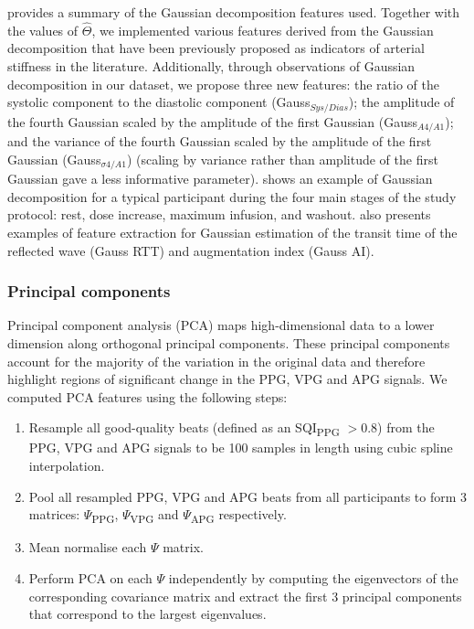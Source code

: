 \documentclass[fleqn,10pt]{wlscirep}
\begin{document}
 provides a summary of the Gaussian decomposition features used. Together with the values of $\hat{\Theta}$, we implemented various features derived from the Gaussian decomposition that have been previously proposed as indicators of arterial stiffness in the literature\cite{Rubins2008,Couceiro2012}. Additionally, through observations of Gaussian decomposition in our dataset, we propose three new features: the ratio of the systolic component to the diastolic component (Gauss$_{Sys/Dias}$); the amplitude of the fourth Gaussian scaled by the amplitude of the first Gaussian (Gauss$_{A4/A1}$); and the variance of the fourth Gaussian scaled by the amplitude of the first Gaussian (Gauss$_{\sigma4/A1}$) (scaling by variance rather than amplitude of the first Gaussian gave a less informative parameter).  shows an example of Gaussian decomposition for a typical participant during the four main stages of the study protocol: rest, dose increase, maximum infusion, and washout.  also presents examples of feature extraction for Gaussian estimation of the transit time of the reflected wave (Gauss RTT) and augmentation index (Gauss AI).


\subsubsection{Principal components}

Principal component analysis (PCA) \cite{Abdi2010PrincipalAnalysis} maps high-dimensional data to a lower dimension along orthogonal principal components. These principal components account for the majority of the variation in the original data and therefore highlight regions of significant change in the PPG, VPG and APG signals. We computed PCA features using the following steps:

\begin{enumerate}
    \item Resample all good-quality beats (defined as an SQI\textsubscript{PPG} $> 0.8$) from the PPG, VPG and APG signals to be 100 samples in length using cubic spline interpolation.
    \item Pool all resampled PPG, VPG and APG beats from all participants to form 3 matrices: $\Psi$\textsubscript{PPG}, $\Psi$\textsubscript{VPG} and $\Psi$\textsubscript{APG} respectively. 
    \item Mean normalise each $\Psi$ matrix.
    \item Perform PCA on each $\Psi$ independently by computing the eigenvectors of the corresponding covariance matrix and extract the first 3 principal components that correspond to the largest eigenvalues.
\end{enumerate}
\end{document}
